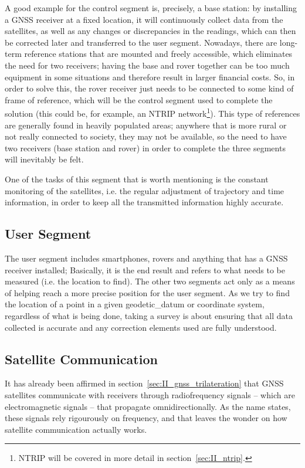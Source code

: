 A good example for the control segment is, precisely, a base station: by installing a GNSS receiver at a fixed location, it will continuously collect data from the satellites, as well as any changes or discrepancies in the readings, which can then be corrected later and transferred to the user segment. Nowadays, there are long-term reference stations that are mounted and freely accessible, which eliminates the need for two receivers; having the base and rover together can be too much equipment in some situations and therefore result in larger financial costs.
So, in order to solve this, the rover receiver just needs to be connected to some kind of frame of reference, which will be the control segment used to complete the solution (this could be, for example, an NTRIP network\footnote{NTRIP will be covered in more detail in section~\ref{sec:II_ntrip}.}).
This type of references are generally found in heavily populated areas; anywhere that is more rural or not really connected to society, they may not be available, so the need to have two receivers (base station and rover) in order to complete the three segments will inevitably be felt.

One of the tasks of this segment that is worth mentioning is the constant monitoring of the satellites, i.e. the regular adjustment of trajectory and time information, in order to keep all the transmitted information highly accurate.

\subsection{User Segment}\label{sec:II_gnss_user_seg}

The user segment includes smartphones, rovers and anything that has a GNSS receiver installed; Basically, it is the end result and refers to what needs to be measured (i.e. the location to find). The other two segments act only as a means of helping reach a more precise position for the user segment.
As we try to find the location of a point in a given \gls{geodetic_datum} or coordinate system, regardless of what is being done, taking a survey is about ensuring that all data collected is accurate and any correction elements used are fully understood.

\subsection{Satellite Communication}\label{sec:II_gnss_comm}

It has already been affirmed in section~\ref{sec:II_gnss_trilateration} that GNSS satellites communicate with receivers through radiofrequency signals -- which are electromagnetic signals -- that propagate omnidirectionally. As the name states, these signals rely rigourously on frequency, and that leaves the wonder on how satellite communication actually works.

